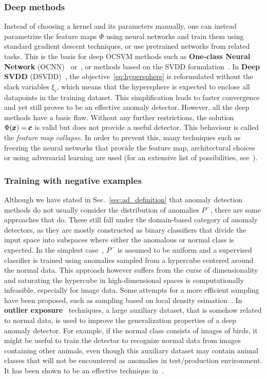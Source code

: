 \subsubsection{Deep methods}
Instead of choosing a kernel and its parameters manually, one can instead parametrize the feature maps $\Phi$ using neural networks and train them using standard gradient descent techniques, or use pretrained networks from related tasks. This is the basis for deep OCSVM methods such as \textbf{One-class Neural Network} (OCNN)~\cite{chalapathy2018anomaly} or~\cite{erfani2016high}, or methods based on the SVDD formulation~\cite{ghafoori2020deep}. In \textbf{Deep SVDD} (DSVDD)~\cite{ruff2018deep}, the objective~\eqref{eq:hypersphere} is reformulated without the slack variables $\xi_i$, which means that the hypersphere is expected to enclose all datapoints in the training dataset. This simplification leads to faster convergence and yet still proves to be an effective anomaly detector. However, all the deep methods have a basic flaw. Without any further restrictions, the solution $\Phi(\pmb{{x}}) = \pmb{{c}}$ is valid but does not provide a useful detector. This behaviour is called the \textit{feature map collapse}. In order to prevent this, many techniques such as freezing the neural networks that provide the feature map, architectural choices or using adversarial learning are used (for an extensive list of possibilities, see~\cite{ruff2020unifying}).

\subsubsection{Training with negative examples}
Although we have stated in Sec.~\ref{sec:ad_definition} that anomaly detection methods do not usually consider the distribution of anomalies $P^-$, there are some approaches that do. These still fall under the domain-based category of anomaly detectors, as they are mostly constructed as binary classifiers that divide the input space into subspaces where either the anomalous or normal class is expected. In the simplest case~\cite{steinwart2005classification}, $P^-$ is assumed to be uniform and a supervised classifier is trained using anomalies sampled from a hypercube centered around the normal data. This approach however suffers from the curse of dimensionality and saturating the hypercube in high-dimensional spaces is computationally infeasible, especially for image data. Some attempts for a more efficient sampling have been proposed, such as sampling based on local density esimation~\cite{fan2004using}. In \textbf{outlier exposure}~\cite{hendrycksDeepAnomalyDetection2019} techniques, a large auxiliary dataset, that is somehow related to normal data, is used to improve the generalization properties of a deep anomaly detector. For example, if the normal class consists of images of birds, it might be useful to train the detector to recognize normal data from images containing other animals, even though this auxiliary dataset may contain animal classes that will not be encountered as anomalies in test/production environment. It has been shown to be an effective technique in~\cite{hendrycks2019using}.  

